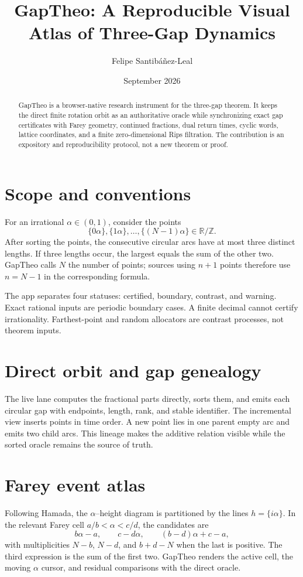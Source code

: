 \documentclass[11pt]{article}
\title{GapTheo: A Reproducible Visual Atlas of Three-Gap Dynamics}
\author{Felipe Santibáñez-Leal}
\date{September 2026}
\begin{document}
\maketitle

\begin{abstract}
GapTheo is a browser-native research instrument for the three-gap theorem.
It keeps the direct finite rotation orbit as an authoritative oracle while
synchronizing exact gap certificates with Farey geometry, continued fractions,
dual return times, cyclic words, lattice coordinates, and a finite
zero-dimensional Rips filtration. The contribution is an expository and
reproducibility protocol, not a new theorem or proof.
\end{abstract}

\section{Scope and conventions}
For an irrational $\alpha\in(0,1)$, consider the points
\[
  \{0\alpha\},\{1\alpha\},\ldots,\{(N-1)\alpha\}\in\mathbb{R}/\mathbb{Z}.
\]
After sorting the points, the consecutive circular arcs have at most three
distinct lengths. If three lengths occur, the largest equals the sum of the
other two. GapTheo calls $N$ the number of points; sources using $n+1$ points
therefore use $n=N-1$ in the corresponding formula.

The app separates four statuses: certified, boundary, contrast, and warning.
Exact rational inputs are periodic boundary cases. A finite decimal cannot
certify irrationality. Farthest-point and random allocators are contrast
processes, not theorem inputs.

\section{Direct orbit and gap genealogy}
The live lane computes the fractional parts directly, sorts them, and emits
each circular gap with endpoints, length, rank, and stable identifier. The
incremental view inserts points in time order. A new point lies in one parent
empty arc and emits two child arcs. This lineage makes the additive relation
visible while the sorted oracle remains the source of truth.

\section{Farey event atlas}
Following Hamada, the $\alpha$--height diagram is partitioned by the lines
$h=\{i\alpha\}$. In the relevant Farey cell
$a/b<\alpha<c/d$, the candidates are
\[
 b\alpha-a,\qquad c-d\alpha,\qquad
 (b-d)\alpha+c-a,
\]
with multiplicities $N-b$, $N-d$, and $b+d-N$ when the last is positive.
The third expression is the sum of the first two. GapTheo renders the active
cell, the moving $\alpha$ cursor, and residual comparisons with the direct
oracle.
\end{document}

